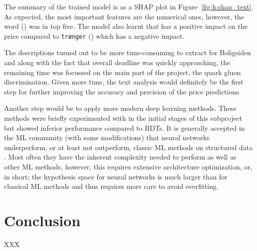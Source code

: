 The summary of the trained model is as a SHAP plot in Figure~\ref{fig:h:shap_text}. As expected, the most important features are the numerical ones, however, the word  () was in top five. The model also learnt that  has a positive impact on the price compared to \colorbox{light-gray}{\texttt{trænger}} () which has a negative impact.

The descriptions turned out to be more time-consuming to extract for Boligsiden and along with the fact that overall deadline was quickly approaching, the remaining time was focussed on the main part of the project, the quark gluon discrimination. Given more time, the text analysis would definitely be the first step for further improving the accuracy and precision of the price predictions. 

Another step would be to apply more modern deep learning methods. These methods were briefly experimented with in the initial stages of this subproject but showed inferior performance compared to BDTs. It is generally accepted in the ML community (with some modifications) that neural networks underperform, or at least not outperform, classic ML methods on structured  data \autocite{klambauerSelfNormalizingNeuralNetworks2017}. Most often they have the inherent complexity needed to perform as well as other ML methods, however, this requires extensive architecture optimization, or, in short; the hypothesis space for neural networks is much larger than for classical ML methods and thus requires more care to avoid overfitting.

\section{Conclusion}
\label{sec:h:conclusion}

XXX \TODO